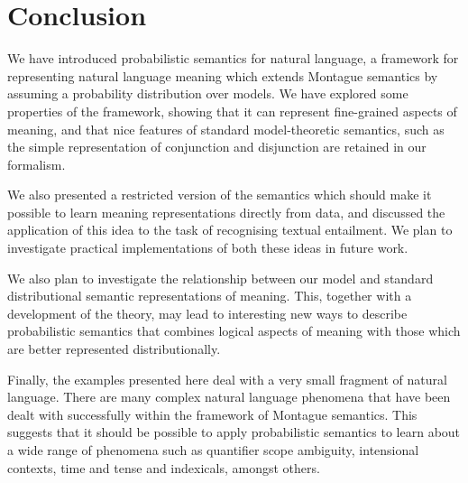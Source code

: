 \documentclass[letterpaper]{article}
\begin{document}
\section{Conclusion}

We have introduced probabilistic semantics for natural language, a
framework for representing natural language meaning which extends
Montague semantics by assuming a probability distribution over
models. We have explored some properties of the framework, showing
that it can represent fine-grained aspects of meaning, and that nice
features of standard model-theoretic semantics, such as the simple
representation of conjunction and disjunction are retained in our
formalism.

We also presented a restricted version of the semantics which should
make it possible to learn meaning representations directly from data,
and discussed the application of this idea to the task of recognising
textual entailment. We plan to investigate practical implementations
of both these ideas in future work.

We also plan to investigate the relationship between our model and
standard distributional semantic representations of meaning. This,
together with a development of the theory, may lead to interesting
new ways to describe probabilistic semantics that combines logical
aspects of meaning with those which are better represented
distributionally.

Finally, the examples presented here deal with a very small fragment
of natural language. There are many complex natural language phenomena
that have been dealt with successfully within the framework of
Montague semantics. This suggests that it should be possible to apply
probabilistic semantics to learn about a wide range of phenomena such
as quantifier scope ambiguity, intensional contexts, time and tense
and indexicals, amongst others.





\end{document}
